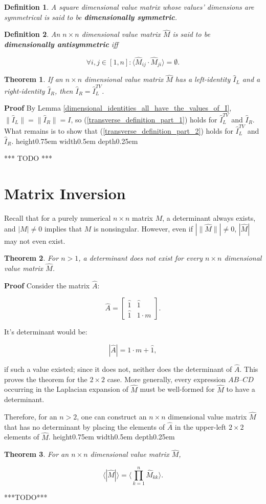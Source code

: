 \documentclass[10pt,letterpaper]{article}
\newtheorem{defn}{Definition}[section]
\newtheorem{thm}{Theorem}[section]
\newenvironment{proof}{\noindent\textbf{Proof} }{\qed \newline}
\newcommand{\qed}{\nobreak \ifvmode \relax \else
      \ifdim\lastskip<1.5em \hskip-\lastskip
      \hskip1.5em plus0em minus0.5em \fi \nobreak
      \vrule height0.75em width0.5em depth0.25em\fi}
\numberwithin{equation}{section}
\begin{document}
\begin{defn}A square dimensional value matrix whose values' dimensions
  are symmetrical is said to be \textbf{dimensionally
    symmetric}. \end{defn}

\begin{defn}An $n \times n$ dimensional value matrix $\hat M$ is said
  to be \textbf{dimensionally antisymmetric} iff

\[ \forall i,j \in [1, n] : \langle \hat M_{ij} \cdot \hat M_{ji} \rangle = \emptyset . \] \end{defn}

\begin{thm}If an $n \times n$ dimensional value matrix $\hat M$ has a
  left-identity $\hat I_L$ and a right-identity $\hat I_R$, then $\hat
  I_R = \hat I^{TV}_L$. \end{thm}

\begin{proof}By Lemma
  \ref{dimensional_identities_all_have_the_values_of_I}, $\| \hat I_L
  \| = \| \hat I_R \| = I$, so (\ref{transverse_definition_part_1})
  holds for $\hat I^{TV}_L$ and $\hat I_R$.  What remains is to show
  that (\ref{transverse_definition_part_2}) holds for $\hat I^{TV}_L$
  and $\hat I_R$. \end{proof}

*** TODO ***

\section{Matrix Inversion}

Recall that for a purely numerical $n \times n$ matrix $M$, a
determinant always exists, and $|M| \not= 0$ implies that $M$ is
nonsingular.  However, even if $| \| \hat M \| | \not= 0$, $| \hat M
|$ may not even exist.

\begin{thm}For $ n > 1$, a determinant does not exist for every $n
  \times n$ dimensional value matrix $\hat M$. \end{thm}

\begin{proof}Consider the matrix $\hat A$:

\[ \hat A = \left[ \begin{matrix}
 \hat 1 & \hat 1 \\
 \hat 1 & 1 \cdot m
 \end{matrix} \right] . \]

It's determinant would be:

\[ | \hat A | = 1 \cdot m + \hat 1 , \]

if such a value existed; since it does not, neither does the
determinant of $\hat A$.  This proves the theorem for the $2 \times 2$
case.  More generally, every expression $AB – CD$ occurring in the
Laplacian expansion of $\hat M$ must be well-formed for $\hat M$ to
have a determinant.

Therefore, for an $n > 2$, one can construct an $n \times n$
dimensional value matrix $\hat M$ that has no determinant by placing
the elements of $\hat A$ in the upper-left $2 \times 2$ elements of
$\hat M$. \end{proof}

\begin{thm}For an $n \times n$ dimensional value matrix $\hat M$,

\[ \langle | \hat M | \rangle = \langle \prod_{k=1}^n \hat M_{kk} \rangle . \] \end{thm}

***TODO***
\end{document}
